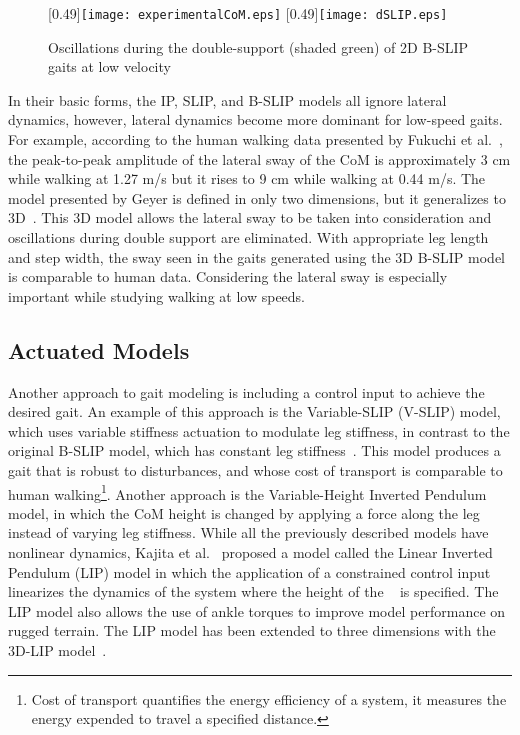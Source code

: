 \begin{figure}
	\centering
	[0.49\textwidth]{\texttt{[image: experimentalCoM.eps]}}%
	\hfill
	[0.49\textwidth]{\texttt{[image: dSLIP.eps]}}%
	\caption{Oscillations during the double-support (shaded green) of 2D B-SLIP gaits at low velocity} \label{fig:traj_compare}
\end{figure}

In their basic forms, the IP, SLIP, and B-SLIP models all ignore lateral dynamics, however, lateral dynamics become more dominant for low-speed gaits. For example, according to the human walking data presented by Fukuchi et al.~\cite{fukuchi2018public}, the peak-to-peak amplitude of the lateral sway of the CoM is approximately 3 cm while walking at 1.27 m/s but it rises to 9 cm while walking at 0.44 m/s. The model presented by Geyer is defined in only two dimensions, but it generalizes to 3D~\cite{liu2015dynamic}. This 3D model allows the lateral sway to be taken into consideration and oscillations during double support are eliminated. With appropriate leg length and step width, the sway seen in the gaits generated using the 3D B-SLIP model is comparable to human data. Considering the lateral sway is especially important while studying walking at low speeds. 

\subsection{Actuated Models}

Another approach to gait modeling is including a control input to achieve the desired gait. An example of this approach is the Variable-SLIP (V-SLIP) model, which uses variable stiffness actuation to modulate leg stiffness, in contrast to the original B-SLIP model, which has constant leg stiffness~\cite{visser2017bipedal}. This model produces a gait that is robust to disturbances, and whose cost of transport is comparable to human walking\footnote{Cost of transport quantifies the energy efficiency of a system, it measures the energy expended to travel a specified distance.}. Another approach is the Variable-Height Inverted Pendulum model, in which the CoM height is changed by applying a force along the leg~\cite{koolen2016balance} instead of varying leg stiffness. While all the previously described models have nonlinear dynamics, Kajita et al.~\cite{kajita1991study} proposed a model called the Linear Inverted Pendulum (LIP) model in which the application of a constrained control input linearizes the dynamics of the system where the height of the \com~ is specified. The LIP model also allows the use of ankle torques to improve model performance on rugged terrain. The LIP model has been extended to three dimensions with the 3D-LIP model~\cite{kajita20013d}.

